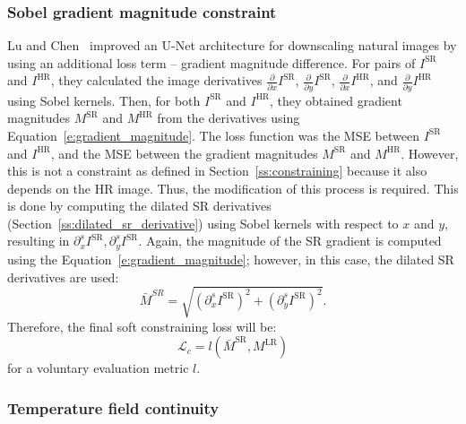 \subsubsection{Sobel gradient magnitude constraint}

Lu and Chen~\cite{Lu2019} improved an U-Net architecture for downscaling natural images by using an additional loss term -- gradient magnitude difference.
For pairs of $I^\text{SR}$ and $I^\text{HR}$, they calculated the image derivatives $\frac{\partial}{\partial x} I^\text{SR}$, $\frac{\partial}{\partial y} I^\text{SR}$, $\frac{\partial}{\partial x} I^\text{HR}$, and $\frac{\partial}{\partial y} I^\text{HR}$ using Sobel kernels.
Then, for both $I^\text{SR}$ and $I^\text{HR}$, they obtained gradient magnitudes $M^\text{SR}$ and $M^\text{HR}$ from the derivatives using Equation~\eqref{e:gradient_magnitude}. 
The loss function was the MSE between $I^\text{SR}$ and $I^\text{HR}$, and the MSE between the gradient magnitudes $M^\text{SR}$ and $M^\text{HR}$.
However, this is not a constraint as defined in Section~\ref{ss:constraining} because it also depends on the HR image.
Thus, the modification of this process is required.
This is done by computing the dilated SR derivatives (Section~\ref{ss:dilated_sr_derivative}) using Sobel kernels with respect to $x$ and $y$, resulting in $\partial^s_x I^\text{SR}, \partial^s_y I^\text{SR}$.
Again, the magnitude of the SR gradient is computed using the Equation~\eqref{e:gradient_magnitude}; however, in this case, the dilated SR derivatives are used:
\begin{equation}
    \bar{M}^{SR} = \sqrt{\left(\partial^s_x I^\text{SR}\right)^2 + \left(\partial^s_y I^\text{SR}\right)^2}.
\end{equation}
Therefore, the final soft constraining loss will be:
\begin{equation}
    \mathcal{L}_c = l\left(\bar{M}^\text{SR}, M^\text{LR}\right) 
\end{equation}
for a voluntary evaluation metric $l$.

\subsubsection{Temperature field continuity}

